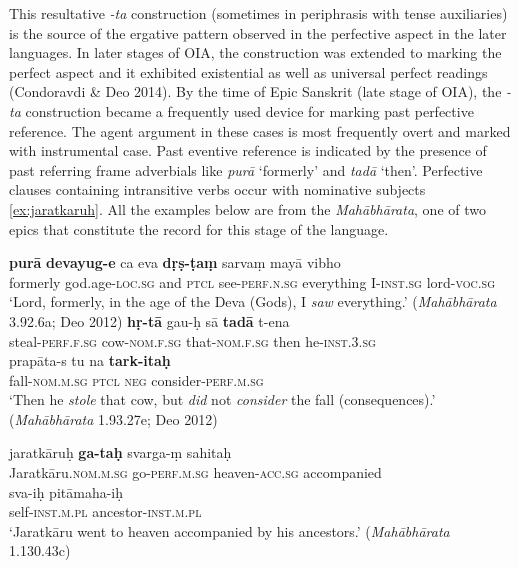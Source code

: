 \documentclass[output=paper,
modfonts
]{LSP/langsci}
\begin{document}
This  resultative \textit{-ta} construction (sometimes in periphrasis with tense auxiliaries)  is the source of
the ergative pattern observed in the perfective aspect in the later
languages.  In later stages of OIA, the construction was extended to
marking the perfect aspect and it exhibited existential as well as
universal perfect readings (Condoravdi \& Deo 2014).  By the time of
Epic Sanskrit (late stage of OIA), the \textit{-ta}
construction became a frequently used device for marking past
perfective reference. The agent argument in these cases is most
frequently overt and marked with instrumental case.   Past eventive reference is indicated
by the presence of past referring frame adverbials like \textit{purā}
`formerly' and \textit{tadā} `then'. Perfective clauses containing intransitive verbs occur with nominative subjects \cref{ex:jaratkaruh}. All the examples below are from the \textit{Mahābhārata}, one of two epics that constitute the record for this stage of the language.

\begin{exe}
\ex\label{ex:ghi}
\begin{xlist}
\ex\label{ex:pura} \gll \textbf{purā}  \textbf{ devayug-e}   ca  eva  \textbf{dṛṣ-ṭaṃ}    sarvaṃ  mayā  vibho\\
formerly  god.age-\textsc{loc.sg}  and  \textsc{ptcl}  see-\textsc{perf.n.sg}  everything I-\textsc{inst.sg}  lord-\textsc{voc.sg}\\
\glt `Lord, formerly, in the age of the Deva (Gods), I \textit{saw} everything.' (\textit{Mahābhārata} 3.92.6a; Deo 2012)
\ex\label{ex:hrta} \gll \textbf{hṛ-tā}  gau-ḥ   sā  \textbf{tadā} t-ena  \\
steal-\textsc{perf.f.sg}  cow-\textsc{nom.f.sg}  that-\textsc{nom.f.sg}  then   he-\textsc{inst.3.sg} \\

\gll prapāta-s   tu  na  \textbf{tark-itaḥ}\\
fall-\textsc{nom.m.sg}  \textsc{ptcl}  \textsc{neg}  consider-\textsc{perf.m.sg}\\
\glt `Then he \textit{stole} that cow, but \textit{did} not \textit{consider} the
fall (consequences).' (\textit{Mahābhārata} 1.93.27e; Deo 2012)

\ex\label{ex:jaratkaruh}\gll jaratkāruḥ \textbf{ga-taḥ} svarga-ṃ sahitaḥ \\
Jaratkāru.\textsc{nom.m.sg} go-\textsc{perf.m.sg} heaven-\textsc{acc.sg} accompanied \\

\gll sva-iḥ pitāmaha-iḥ \\
self-\textsc{inst.m.pl}  ancestor-\textsc{inst.m.pl} \\
\glt `Jaratkāru went to heaven accompanied by his ancestors.' (\textit{Mahābhārata} 1.130.43c)
\end{xlist}
\end{exe}
\end{document}
